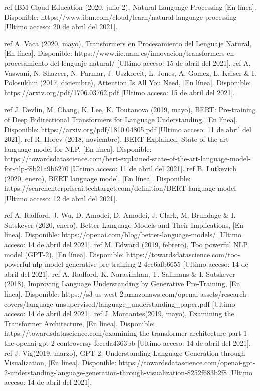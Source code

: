 \documentclass[12pt, a4paper, titlepage]{report}
\begin{document}
\begin{thebibliography}{20}
	ref IBM Cloud Education (2020, julio 2), Natural Language Processing [En línea]. Disponible: https://www.ibm.com/cloud/learn/natural-language-processing [Ultimo acceso: 20 de abril del 2021].
	
	ref A. Vaca (2020, mayo), Transformers en Procesamiento del Lenguaje Natural, [En línea]. Disponible: https://www.iic.uam.es/innovacion/transformers-en-procesamiento-del-lenguaje-natural/ [Ultimo acceso: 15 de abril del 2021].
	ref A. Vaswani, N. Shazeer, N. Parmar, J. Uszkoreit, L. Jones, A. Gomez, L. Kaiser \& I. Polosukhin (2017, diciembre), Attention Is All You Need, [En línea]. Disponible: https://arxiv.org/pdf/1706.03762.pdf [Ultimo acceso: 15 de abril del 2021].
	
	ref J. Devlin, M. Chang, K. Lee, K. Toutanova (2019, mayo), BERT: Pre-training of Deep Bidirectional Transformers for
	Language Understanding, [En línea]. Disponible: https://arxiv.org/pdf/1810.04805.pdf [Ultimo acceso: 11 de abril del 2021].
	ref R. Horev (2018, noviembre), BERT Explained: State of the art language model for NLP, [En línea]. Disponible: https://towardsdatascience.com/bert-explained-state-of-the-art-language-model-for-nlp-f8b21a9b6270 [Ultimo acceso: 11 de abril del 2021].
	ref B. Lutkevich (2020, enero), BERT language model, [En línea]. Disponible: https://searchenterpriseai.techtarget.com/definition/BERT-language-model [Ultimo acceso: 12 de abril del 2021].
	
	ref A. Radford, J. Wu, D. Amodei, D. Amodei, J. Clark, M. Brundage \& I. Sutskever (2020, enero), Better Language Models and Their Implications, [En línea]. Disponible: https://openai.com/blog/better-language-models/ [Ultimo acceso: 14 de abril del 2021].
	ref M. Edward (2019, febrero), Too powerful NLP model (GPT-2), [En línea]. Disponible: https://towardsdatascience.com/too-powerful-nlp-model-generative-pre-training-2-4cc6afb6655 [Ultimo acceso: 14 de abril del 2021].
	ref A. Radford, K. Narasimhan, T. Salimans \& I. Sutskever (2018), Improving Language Understanding by Generative Pre-Training, [En línea]. Disponible: https://s3-us-west-2.amazonaws.com/openai-assets/research-covers/language-unsupervised/language\_understanding\_paper.pdf [Ultimo acceso: 14 de abril del 2021].
	ref J. Montantes(2019, mayo), Examining the Transformer Architecture, [En línea]. Disponible: https://towardsdatascience.com/examining-the-transformer-architecture-part-1-the-openai-gpt-2-controversy-feceda4363bb [Ultimo acceso: 14 de abril del 2021].
	ref J. Vig(2019, marzo), GPT-2: Understanding Language Generation through Visualization, [En línea]. Disponible: https://towardsdatascience.com/openai-gpt-2-understanding-language-generation-through-visualization-8252f683b2f8 [Ultimo acceso: 14 de abril del 2021].
	

\end{thebibliography}
\end{document}
